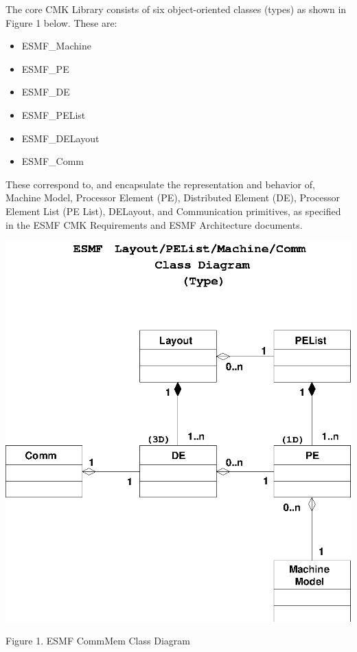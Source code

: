 

The core CMK Library consists of six object-oriented classes (types)
as shown in Figure 1 below.  These are:

\begin{itemize}
\item ESMF\_Machine
\item ESMF\_PE
\item ESMF\_DE
\item ESMF\_PEList
\item ESMF\_DELayout
\item ESMF\_Comm
\end{itemize}

These correspond to, and encapsulate the representation and
behavior of, Machine Model, Processor Element (PE), Distributed Element (DE),
Processor Element List (PE List), DELayout, and Communication primitives, as
specified in the ESMF CMK Requirements and ESMF Architecture documents.

\begin{center}
\includegraphics{CommMemClass.EPS}

Figure 1.  ESMF CommMem Class Diagram

\end{center}

